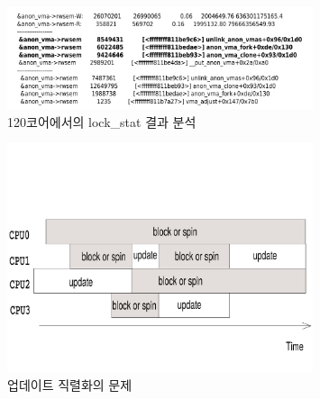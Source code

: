 \begin{figure}[h]
    \centering
    \includegraphics[width=0.8\textwidth]{fig/anon_vma_func}
    \caption{120코어에서의 lock\_stat 결과 분석}
  \label{fig:anon_vma_func}
\end{figure}



 \begin{figure}[h]
    \centering
    \includegraphics[width=0.8\textwidth]{fig/update}
    \caption{업데이트 직렬화의 문제}
  \label{fig:update}
\end{figure}




